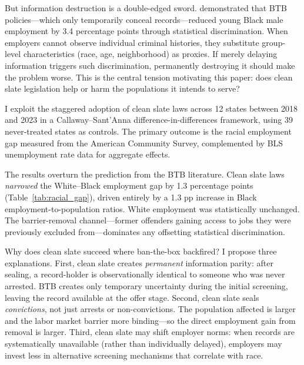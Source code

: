 \documentclass[12pt]{article}
\begin{document}
But information destruction is a double-edged sword. \citet{doleac2020} demonstrated that BTB policies---which only temporarily conceal records---reduced young Black male employment by 3.4 percentage points through statistical discrimination. When employers cannot observe individual criminal histories, they substitute group-level characteristics (race, age, neighborhood) as proxies. If merely delaying information triggers such discrimination, permanently destroying it should make the problem worse. This is the central tension motivating this paper: does clean slate legislation help or harm the populations it intends to serve?

I exploit the staggered adoption of clean slate laws across 12 states between 2018 and 2023 in a Callaway--Sant'Anna difference-in-differences framework, using 39 never-treated states as controls. The primary outcome is the racial employment gap measured from the American Community Survey, complemented by BLS unemployment rate data for aggregate effects.

The results overturn the prediction from the BTB literature. Clean slate laws \emph{narrowed} the White--Black employment gap by 1.3 percentage points (Table~\ref{tab:racial_gap}), driven entirely by a 1.3 pp increase in Black employment-to-population ratios. White employment was statistically unchanged. The barrier-removal channel---former offenders gaining access to jobs they were previously excluded from---dominates any offsetting statistical discrimination.

Why does clean slate succeed where ban-the-box backfired? I propose three explanations. First, clean slate creates \emph{permanent} information parity: after sealing, a record-holder is observationally identical to someone who was never arrested. BTB creates only temporary uncertainty during the initial screening, leaving the record available at the offer stage. Second, clean slate seals \emph{convictions}, not just arrests or non-convictions. The population affected is larger and the labor market barrier more binding---so the direct employment gain from removal is larger. Third, clean slate may shift employer norms: when records are systematically unavailable (rather than individually delayed), employers may invest less in alternative screening mechanisms that correlate with race.
\end{document}
